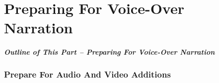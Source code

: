 \begin{comment}
*      ================
*  [[elisp:(org-cycle)][| ]] [[elisp:(org-show-subtree)][|=]] [[elisp:(show-children 10)][|V]] [[elisp:(bx:orgm:indirectBufOther)][|>]] [[elisp:(bx:orgm:indirectBufMain)][|I]] [[elisp:(blee:ppmm:org-mode-toggle)][|N]] [[elisp:(org-top-overview)][|O]] [[elisp:(progn (org-shifttab) (org-content))][|C]] [[elisp:(delete-other-windows)][|1]]  *Part 0*   /Preparing For Voice-Over Narration/ ::  [[elisp:(org-cycle)][| ]]
\end{comment}

\newpage
\part{Preparing For Voice-Over Narration}
\label{part:PreparingForVoice-OverNarration}

\begin{latexonly}
\begin{presentationMode}
\begin{frame}[fragile,plain,label=Part0]
\frametitle{Outline of This Part -- Preparing For Voice-Over Narration}
\tableofcontents[sectionstyle=show,subsectionstyle=show]
\end{frame}
\end{presentationMode}
\end{latexonly}



\begin{comment}
*  [[elisp:(org-cycle)][| ]] [[elisp:(org-show-subtree)][|=]] [[elisp:(show-children 10)][|V]] [[elisp:(bx:orgm:indirectBufOther)][|>]] [[elisp:(bx:orgm:indirectBufMain)][|I]] [[elisp:(blee:ppmm:org-mode-toggle)][|N]] [[elisp:(org-top-overview)][|O]] [[elisp:(progn (org-shifttab) (org-content))][|C]] [[elisp:(delete-other-windows)][|1]]  /Section/   Prepare For Audio And Video Additions ::  [[elisp:(org-cycle)][| ]]
\end{comment}

\section{Prepare For Audio And Video Additions}


